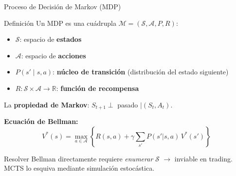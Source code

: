 \documentclass[aspectratio=169, 10pt]{beamer}
\begin{document}
\begin{frame}{Proceso de Decisión de Markov (MDP)}
  \begin{block}{Definición}
    Un MDP es una cuádrupla $\mathcal{M} = (\mathcal{S},\mathcal{A},P,R)$:
    \begin{itemize}
      \item $\mathcal{S}$: espacio de \textbf{estados}
      \item $\mathcal{A}$: espacio de \textbf{acciones}
      \item $P(s'\mid s,a)$: \textbf{núcleo de transición}
        (distribución del estado siguiente)
      \item $R:\mathcal{S}\times\mathcal{A}\to\mathbb{R}$:
        \textbf{función de recompensa}
    \end{itemize}
    La \textbf{propiedad de Markov}: $S_{t+1}\perp$ pasado $\mid (S_t,A_t)$.
  \end{block}

      \textbf{Ecuación de Bellman:}
      \[
        V^*(s) = \max_{a\in\mathcal{A}}\!\left\{
          R(s,a) + \gamma\sum_{s'} P(s'|s,a)\,V^*(s')
        \right\}
      \]

  \begin{alertblock}{}
    Resolver Bellman directamente requiere \emph{enumerar} $\mathcal{S}$
    $\to$ inviable en trading. MCTS lo esquiva mediante simulación estocástica.
  \end{alertblock}
\end{frame}
\end{document}
